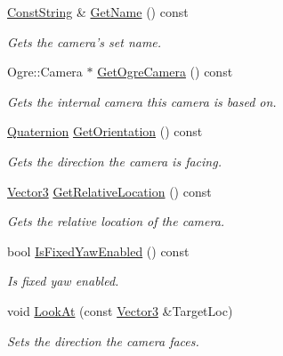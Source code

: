 \begin{DoxyCompactItemize}
\hyperlink{namespaceMezzanine_a63cd699ac54b73953f35ec9cfc05e506}{ConstString} \& \hyperlink{classMezzanine_1_1Camera_abf6e3c2e642753023acd91f6d1413455}{GetName} () const 
\begin{DoxyCompactList}\small\item\em Gets the camera's set name. \item\end{DoxyCompactList}\item 
Ogre::Camera $\ast$ \hyperlink{classMezzanine_1_1Camera_ac7985618c8f908a6cc93069ccb51bb47}{GetOgreCamera} () const 
\begin{DoxyCompactList}\small\item\em Gets the internal camera this camera is based on. \item\end{DoxyCompactList}\item 
\hyperlink{classMezzanine_1_1Quaternion}{Quaternion} \hyperlink{classMezzanine_1_1Camera_af693fe97c4f281940a33dc8087a80fcb}{GetOrientation} () const 
\begin{DoxyCompactList}\small\item\em Gets the direction the camera is facing. \item\end{DoxyCompactList}\item 
\hyperlink{classMezzanine_1_1Vector3}{Vector3} \hyperlink{classMezzanine_1_1Camera_a3262342c754eb31b4caa0693c5b60842}{GetRelativeLocation} () const 
\begin{DoxyCompactList}\small\item\em Gets the relative location of the camera. \item\end{DoxyCompactList}\item 
bool \hyperlink{classMezzanine_1_1Camera_adfe5be54632aeedb9656c850f3f03ae5}{IsFixedYawEnabled} () const 
\begin{DoxyCompactList}\small\item\em Is fixed yaw enabled. \item\end{DoxyCompactList}\item 
void \hyperlink{classMezzanine_1_1Camera_a8343f2d2fb174937aef2894ebf8a5e29}{LookAt} (const \hyperlink{classMezzanine_1_1Vector3}{Vector3} \&TargetLoc)
\begin{DoxyCompactList}\small\item\em Sets the direction the camera faces. \item\end{DoxyCompactList}\item 

\end{DoxyCompactItemize}
